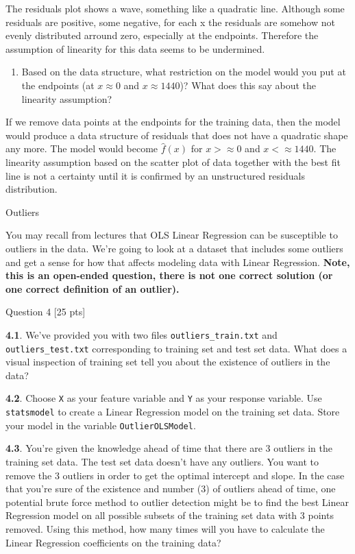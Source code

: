 \documentclass[11pt]{article}
\providecommand{\tightlist}{%
      \setlength{\itemsep}{0pt}\setlength{\parskip}{0pt}}
\begin{document}
The residuals plot shows a wave, something like a quadratic line.
Although some residuals are positive, some negative, for each x the
residuals are somehow not evenly distributed arround zero, especially at
the endpoints. Therefore the assumption of linearity for this data seems
to be undermined.

\begin{enumerate}
\def\labelenumi{\arabic{enumi}.}
\setcounter{enumi}{5}
\tightlist
\item
  Based on the data structure, what restriction on the model would you
  put at the endpoints (at \(x\approx0\) and \(x\approx1440\))? What
  does this say about the linearity assumption?
\end{enumerate}

If we remove data points at the endpoints for the training data, then
the model would produce a data structure of residuals that does not have
a quadratic shape any more. The model would become \(\hat{f}(x)\) for
\(x>\approx0\) and \(x<\approx1440\). The linearity assumption based on
the scatter plot of data together with the best fit line is not a
certainty until it is confirmed by an unstructured residuals
distribution.

    Outliers

You may recall from lectures that OLS Linear Regression can be
susceptible to outliers in the data. We're going to look at a dataset
that includes some outliers and get a sense for how that affects
modeling data with Linear Regression. \textbf{Note, this is an
open-ended question, there is not one correct solution (or one correct
definition of an outlier).}

     Question 4 {[}25 pts{]}

\textbf{4.1}. We've provided you with two files
\texttt{outliers\_train.txt} and \texttt{outliers\_test.txt}
corresponding to training set and test set data. What does a visual
inspection of training set tell you about the existence of outliers in
the data?

\textbf{4.2}. Choose \texttt{X} as your feature variable and \texttt{Y}
as your response variable. Use \texttt{statsmodel} to create a Linear
Regression model on the training set data. Store your model in the
variable \texttt{OutlierOLSModel}.

\textbf{4.3}. You're given the knowledge ahead of time that there are 3
outliers in the training set data. The test set data doesn't have any
outliers. You want to remove the 3 outliers in order to get the optimal
intercept and slope. In the case that you're sure of the existence and
number (3) of outliers ahead of time, one potential brute force method
to outlier detection might be to find the best Linear Regression model
on all possible subsets of the training set data with 3 points removed.
Using this method, how many times will you have to calculate the Linear
Regression coefficients on the training data?
\end{document}
